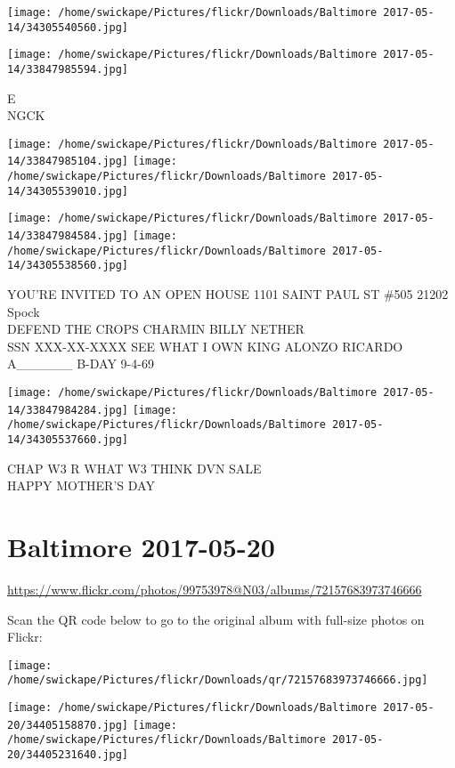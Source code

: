 \documentclass[10pt,letterpaper]{article}
\begin{document}
\texttt{[image: /home/swickape/Pictures/flickr/Downloads/Baltimore 2017-05-14/34305540560.jpg]}

\vspace{0.25in}
\texttt{[image: /home/swickape/Pictures/flickr/Downloads/Baltimore 2017-05-14/33847985594.jpg]}

E\\
NGCK
\pagebreak

\texttt{[image: /home/swickape/Pictures/flickr/Downloads/Baltimore 2017-05-14/33847985104.jpg]}
\texttt{[image: /home/swickape/Pictures/flickr/Downloads/Baltimore 2017-05-14/34305539010.jpg]}

\texttt{[image: /home/swickape/Pictures/flickr/Downloads/Baltimore 2017-05-14/33847984584.jpg]}
\texttt{[image: /home/swickape/Pictures/flickr/Downloads/Baltimore 2017-05-14/34305538560.jpg]}

YOU'RE INVITED TO AN OPEN HOUSE 1101 SAINT PAUL ST \#505 21202\\
Spock\\
DEFEND THE CROPS CHARMIN BILLY NETHER\\
SSN XXX{-}XX{-}XXXX SEE WHAT I OWN KING ALONZO RICARDO A\_\_\_\_\_\_ B{-}DAY 9{-}4{-}69
\pagebreak

\texttt{[image: /home/swickape/Pictures/flickr/Downloads/Baltimore 2017-05-14/33847984284.jpg]}
\texttt{[image: /home/swickape/Pictures/flickr/Downloads/Baltimore 2017-05-14/34305537660.jpg]}

CHAP W3 R WHAT W3 THINK DVN SALE\\
HAPPY MOTHER'S DAY
\pagebreak

\section*{Baltimore 2017-05-20}

\url{https://www.flickr.com/photos/99753978@N03/albums/72157683973746666}

Scan the QR code below to go to the original album with full-size photos on Flickr:

\texttt{[image: /home/swickape/Pictures/flickr/Downloads/qr/72157683973746666.jpg]}
\pagebreak

\texttt{[image: /home/swickape/Pictures/flickr/Downloads/Baltimore 2017-05-20/34405158870.jpg]}
\texttt{[image: /home/swickape/Pictures/flickr/Downloads/Baltimore 2017-05-20/34405231640.jpg]}
\end{document}
